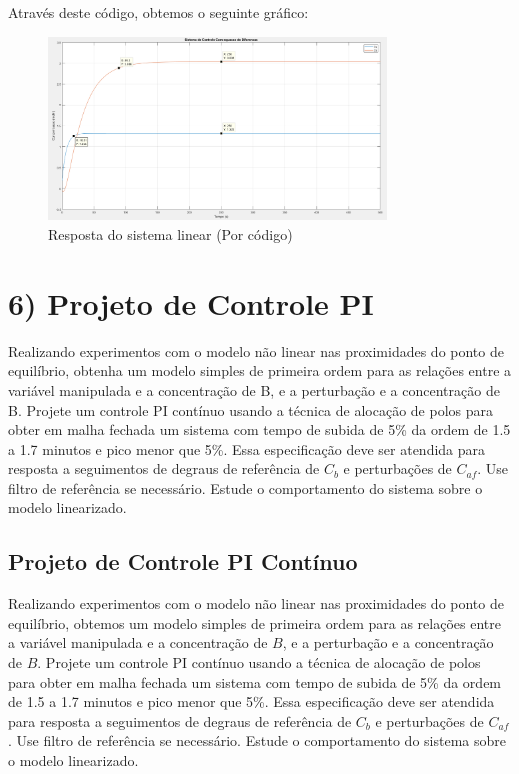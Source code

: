\documentclass[a4paper,12pt]{report}
\begin{document}
Através deste código, obtemos o seguinte gráfico:

\begin{figure}[h]
\centering
\includegraphics[width=0.8\textwidth]{figura13.png}
\caption{Resposta do sistema linear (Por código)}
\end{figure}



\newpage

\section{6) Projeto de Controle PI}

Realizando experimentos com o modelo não linear nas proximidades do ponto de equilíbrio, obtenha um modelo simples de primeira ordem para as relações entre a variável manipulada e a concentração de B, e a perturbação e a concentração de B. Projete um controle PI contínuo usando a técnica de alocação de polos para obter em malha fechada um sistema com tempo de subida de 5\% da ordem de 1.5 a 1.7 minutos e pico menor que 5\%. Essa especificação deve ser atendida para resposta a seguimentos de degraus de referência de \( C_b \) e perturbações de \( C_{af} \). Use filtro de referência se necessário. Estude o comportamento do sistema sobre o modelo linearizado.


\subsection*{Projeto de Controle PI Contínuo}

Realizando experimentos com o modelo não linear nas proximidades do ponto de equilíbrio, obtemos um modelo simples de primeira ordem para as relações entre a variável manipulada e a concentração de \( B \), e a perturbação e a concentração de \( B \). Projete um controle PI contínuo usando a técnica de alocação de polos para obter em malha fechada um sistema com tempo de subida de 5\% da ordem de 1.5 a 1.7 minutos e pico menor que 5\%. Essa especificação deve ser atendida para resposta a seguimentos de degraus de referência de \( C_b \) e perturbações de \( C_{af} \). Use filtro de referência se necessário. Estude o comportamento do sistema sobre o modelo linearizado.
\end{document}
